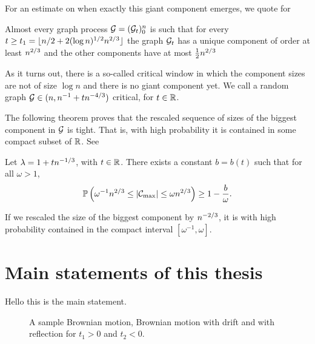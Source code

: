 For an estimate on when exactly this giant component emerges, we quote \cite[Theorem 6.8, p.142]{Bollobas.2001} for
\begin{theorem}
	Almost every graph process $\mathcal{G} = (\mathcal{G}_t)_0^n$ is such that 
	for every $t \geq t_1 = \lfloor n/2 + 2(\log n)^{1/2}n^{2 / 3} \rfloor$ 
	the graph $\mathcal{G}_t$ has a unique component of order at least $n^{2 / 3}$ and the other components have at most $\frac{1}{2}n^{2 / 3}$
\end{theorem}





As it turns out, there is a so-called critical window in which the component sizes are not of size $\log n$ and there is no giant component yet.
We call a random graph $\mathcal{G} \in \mathscr(n, n^{-1} + tn^{-4 / 3})$ critical, for $t \in \mathbb{R}$.

The following theorem proves that the rescaled sequence of sizes of the biggest component in $\mathcal{G}$ is tight.
That is, with high probability it is contained in some compact subset of $\mathbb{R}$.
See \cite[Theorem 5.1, p.150]{vanderHofstad.2016}
\begin{theorem}
	Let $\lambda = 1 + tn^{-1 / 3}$, with $t \in \mathbb{R}$.
	There exists a constant $b = b(t)$ such that for all $\omega > 1$,
	\begin{equation}
		\mathbb{P}\left( \omega^{-1} n^{2 / 3} \leq |\mathcal{C}_{\max}| \leq \omega n^{2 / 3}\right) \geq 1 - \frac{b}{\omega}.
	\end{equation}	
\end{theorem}

If we rescaled the size of the biggest component by $n^{-2 / 3}$,
it is with high probability contained in the compact interval $[\omega^{-1}, \omega]$.











\section{Main statements of this thesis}
Hello this is the main statement.
\begin{figure}%
	\centering
	\subfloat[$W(s)$]{}%
	\quad
	\subfloat[$W^{t_1}(s)$]{}%
	\quad
	\subfloat[$B^{t_1}(s)$]{}%
	\quad
	\subfloat[$W^{t_2}(s)$]{}%
	\quad
	\subfloat[$B^{t_2}(s)$]{}%
	\caption{A sample Brownian motion, Brownian motion with drift and with reflection for $t_1>0$ and $t_2<0$.}%
	\label{F: BM}%
\end{figure}

